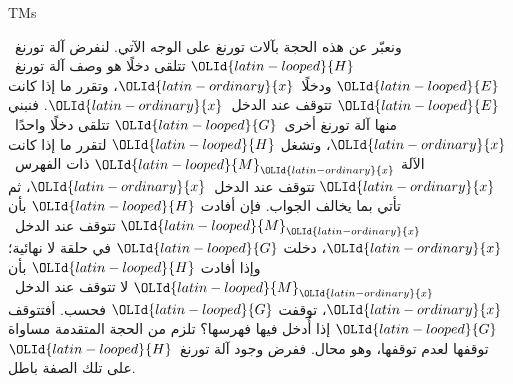\documentclass[../../../include/open-logic-section]{subfiles}
\begin{document}
\begin{tagblock}{TMs}
\begin{explain}
ونعبّر عن هذه الحجة بآلات تورنغ على الوجه الآتي. لنفرض آلة تورنغ~$\OLId{latin-looped}{H}$ تتلقى
دخلًا هو وصف آلة تورنغ~$\OLId{latin-looped}{E}$ ودخلًا~$\OLId{latin-ordinary}{x}$، وتقرر ما إذا كانت $\OLId{latin-looped}{E}$ تتوقف
عند الدخل~$\OLId{latin-ordinary}{x}$. فنبني منها آلة تورنغ أخرى~$\OLId{latin-looped}{G}$ تتلقى دخلًا
واحدًا~$\OLId{latin-ordinary}{x}$، وتشغل $\OLId{latin-looped}{H}$ لتقرر ما إذا كانت الآلة $\OLId{latin-looped}{M}_\OLId{latin-ordinary}{x}$ ذات الفهرس~$\OLId{latin-ordinary}{x}$
تتوقف عند الدخل~$\OLId{latin-ordinary}{x}$، ثم تأتي بما يخالف الجواب. فإن أفادت $\OLId{latin-looped}{H}$ بأن
$\OLId{latin-looped}{M}_\OLId{latin-ordinary}{x}$ تتوقف عند الدخل~$\OLId{latin-ordinary}{x}$، دخلت $\OLId{latin-looped}{G}$ في حلقة لا نهائية؛ وإذا أفادت
$\OLId{latin-looped}{H}$ بأن $\OLId{latin-looped}{M}_\OLId{latin-ordinary}{x}$ لا تتوقف عند الدخل~$\OLId{latin-ordinary}{x}$، توقفت $\OLId{latin-looped}{G}$ فحسب. أفتتوقف $\OLId{latin-looped}{G}$
إذا أُدخل فيها فهرسها؟ تلزم من الحجة المتقدمة مساواة توقفها لعدم
توقفها، وهو محال. ففرض وجود آلة تورنغ~$\OLId{latin-looped}{H}$ على تلك الصفة
باطل.
\end{explain}
\end{tagblock}
\end{document}
